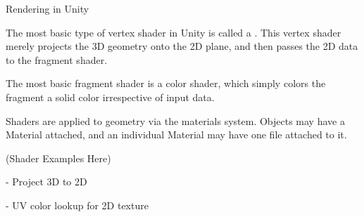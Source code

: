 \documentclass[11pt]{article}
\begin{document}
\begin{topic}{Rendering in Unity}
	\item The most basic type of vertex shader in Unity is called a . This vertex shader merely projects the 3D geometry onto the 2D plane, and then passes the 2D data to the fragment shader.
	\item The most basic fragment shader is a color shader, which simply colors the fragment a solid color irrespective of input data.
	\item Shaders are applied to geometry via the materials system. Objects may have a Material attached, and an individual Material may have one  file attached to it.
	\item (Shader Examples Here)
	\item {} - Project 3D to 2D
	\item {} - UV color lookup for 2D texture
\end{topic}
\end{document}
